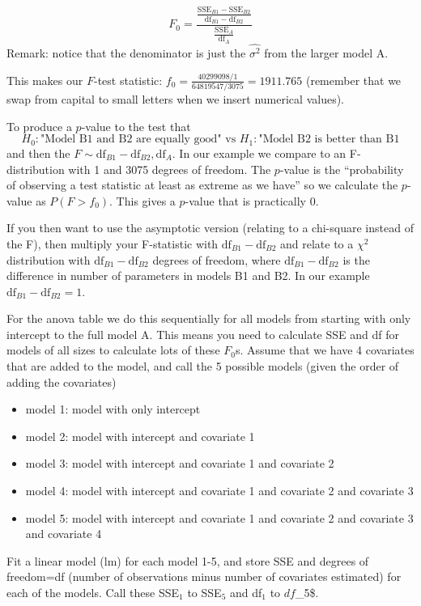 \documentclass[
]{article}
\begin{document}
\[ F_0=\frac{\frac{\text{SSE}_{B1}-\text{SSE}_{B2}}{\text{df}_{B1}-\text{df}_{B2}}}{\frac{\text{SSE}_A}{\text{df}_A}}\]
Remark: notice that the denominator is just the \(\hat{\sigma^2}\) from
the larger model A.

This makes our \(F\)-test statistic:
\(f_0=\frac{40299098/1}{64819547/3075}=1911.765\) (remember that we swap
from capital to small letters when we insert numerical values).

To produce a \(p\)-value to the test that
\[H_0: \text{"Model B1 and B2 are equally good" vs }H_1:\text{"Model B2 is better than B1}\]
and then the \(F\sim {\text{df}_{B1}-\text{df}_{B2},\text{df}_A}\). In
our example we compare to an F-distribution with 1 and 3075 degrees of
freedom. The \(p\)-value is the ``probability of observing a test
statistic at least as extreme as we have'' so we calculate the
\(p\)-value as \(P(F>f_0)\). This gives a \(p\)-value that is
practically 0.

If you then want to use the asymptotic version (relating to a chi-square
instead of the F), then multiply your F-statistic with
\(\text{df}_{B1}-\text{df}_{B2}\) and relate to a \(\chi^2\)
distribution with \(\text{df}_{B1}-\text{df}_{B2}\) degrees of freedom,
where \(\text{df}_{B1}-\text{df}_{B2}\) is the difference in number of
parameters in models B1 and B2. In our example
\(\text{df}_{B1}-\text{df}_{B2}=1\).

For the anova table we do this sequentially for all models from starting
with only intercept to the full model A. This means you need to
calculate SSE and df for models of all sizes to calculate lots of these
\(F_0\)s. Assume that we have 4 covariates that are added to the model,
and call the 5 possible models (given the order of adding the
covariates)

\begin{itemize}
\item
  model 1: model with only intercept
\item
  model 2: model with intercept and covariate 1
\item
  model 3: model with intercept and covariate 1 and covariate 2
\item
  model 4: model with intercept and covariate 1 and covariate 2 and
  covariate 3
\item
  model 5: model with intercept and covariate 1 and covariate 2 and
  covariate 3 and covariate 4
\end{itemize}

Fit a linear model (lm) for each model 1-5, and store SSE and degrees of
freedom=df (number of observations minus number of covariates estimated)
for each of the models. Call these SSE\(_1\) to SSE\(_5\) and df\(_1\)
to \(df\)\_5\$.
\end{document}
